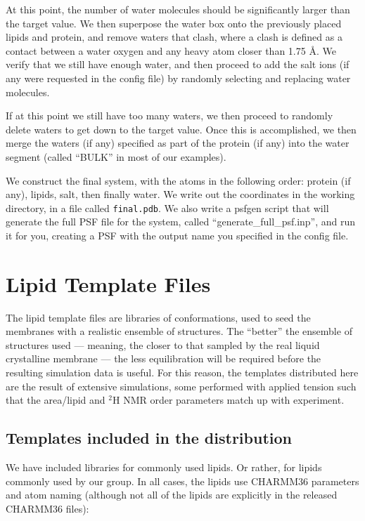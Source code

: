 \documentclass[12pt]{article}
\begin{document}
At this point, the number of water molecules should be significantly larger
than the target value.  We then superpose the water box onto the previously
placed lipids and protein, and remove waters that clash, where a clash is
defined as a contact between a water oxygen and any heavy atom closer than 1.75
{\AA}.  We verify that we still have enough water, and then proceed to add
the salt ions (if any were requested in the config file) by randomly
selecting and replacing water molecules.

If at this point we still have too many waters, we then proceed to randomly
delete waters to get down to the target value.  Once this is accomplished, we
then merge the waters (if any) specified as part of the protein (if any) into
the water segment (called ``BULK'' in most of our examples).

We construct the final system, with the atoms in the following order: protein
(if any), lipids, salt, then finally water.  We write out the coordinates in
the working directory, in a file called {\tt final.pdb}.  We also write a
psfgen script that will generate the full PSF file for the system, called
``generate\_full\_psf.inp'', and run it for you, creating a PSF with the
output name you specified in the config file.

\section{Lipid Template Files}
\label{s:library}

The lipid template files are libraries of conformations, used to seed the
membranes with a realistic ensemble of structures.  The ``better'' the
ensemble of structures used --- meaning, the closer to that sampled by the
real liquid crystalline membrane --- the less equilibration will be required
before the resulting simulation data is useful.  For this reason, the
templates distributed here are the result of extensive simulations, some
performed with applied tension such that the area/lipid and $^2$H NMR order
parameters match up with experiment.  

\subsection{Templates included in the distribution}
\label{ss:included}

We have included libraries for commonly used lipids.  Or rather, for lipids
commonly used by our group.  In all cases, the lipids use CHARMM36 parameters
and atom naming (although not all of the lipids are explicitly in the
released CHARMM36 files):
\end{document}
